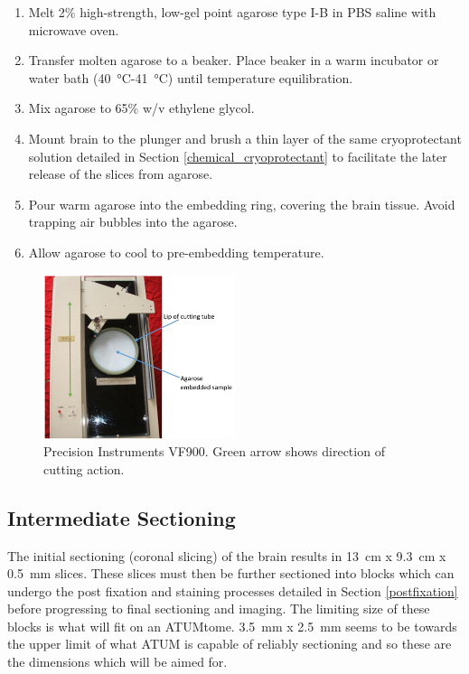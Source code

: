 \documentclass[a4paper, 11pt]{article}
\numberwithin{equation}{section}
\begin{document}
	\begin{enumerate}
		\item Melt 2\% high-strength, low-gel point agarose type I-B in PBS saline with microwave oven.
		\item Transfer molten agarose to a beaker. Place beaker in a warm incubator or water bath (\SI{40}{\degreeCelsius}-\SI{41}{\degreeCelsius}) until temperature equilibration.
		\item Mix agarose to 65\% w/v ethylene glycol.
		\item Mount brain to the plunger and brush a thin layer of the same cryoprotectant solution detailed in Section \ref{chemical_cryoprotectant} to facilitate the later release of the slices from agarose.
		\item Pour warm agarose into the embedding ring, covering the brain tissue. Avoid trapping air bubbles into the agarose.
		\item Allow agarose to cool to pre-embedding temperature.
	\end{enumerate}
	
	\begin{figure}[h]
		\centering
		\includegraphics[width=0.5\textwidth]{VF900}
		\caption[VF900 Caption]{Precision Instruments VF900\footnotemark\label{precision_instruments}. Green arrow shows direction of cutting action.}
		\label{VF900}
	\end{figure}
	
	\newpage
	\subsection{Intermediate Sectioning}
	\label{sectioning_smaller}
	
	The initial sectioning (coronal slicing) of the brain results in \SI{13}{\centi\meter} x \SI{9.3}{\centi\meter} x \SI{0.5}{\milli\meter} slices. These slices must then be further sectioned into blocks which can undergo the post fixation and staining processes detailed in Section \ref{postfixation} before progressing to final sectioning and imaging. The limiting size of these blocks is what will fit on an ATUMtome. \SI{3.5}{\milli\metre} x \SI{2.5}{\milli\meter} seems to be towards the upper limit of what ATUM is capable of reliably sectioning \cite{hayworth2014atum} and so these are the dimensions which will be aimed for.
	
\end{document}
